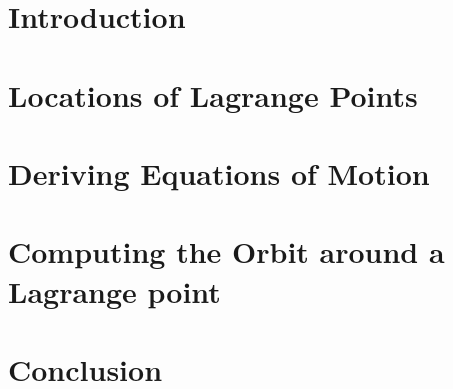 \documentclass[12pt]{article}
\begin{document}
	
	
	{\singlespacing \tableofcontents}
	
	\newpage
	
	\section{Introduction}
	
	
	
	\section{Locations of Lagrange Points}
	
	
	
	\section{Deriving Equations of Motion}
	
	
	
	\section{Computing the Orbit around a Lagrange point}
	
	
	
	\section{Conclusion}
	
	
	
	\newpage
	
	
	\printbibliography[
	heading=bibintoc,
	title={Bibliography}
	]
	
	
	
	
	
\end{document}
